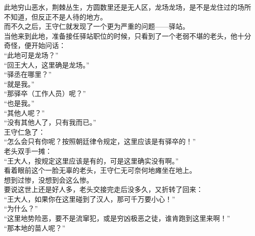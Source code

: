 \begin{multicols}{\theparacolNo}
此地穷山恶水，荆棘丛生，方圆数里还是无人区，龙场龙场，是不是龙住过的场所不知道，但反正不是人待的地方。\\

而不久之后，王守仁就发现了一个更为严重的问题——驿站。\\

当他来到此地，准备接任驿站职位的时候，只看到了一个老弱不堪的老头，他十分奇怪，便开始问话：\\

“此地可是龙场？”\\

“回王大人，这里确是龙场。”\\

“驿丞在哪里？”\\

“就是我。”\\

“那驿卒（工作人员）呢？”\\

“也是我。”\\

“其他人呢？”\\

“没有其他人了，只有我而已。”\\

王守仁急了：\\

“怎么会只有你呢？按照朝廷律令规定，这里应该是有驿卒的！”\\

老头双手一摊：\\

“王大人，按规定这里应该是有的，可是这里确实没有啊。”\\

看着眼前这个一脸无辜的老头，王守仁无可奈何地瘫坐在地上。\\

想到过惨，没想到会这么惨。\\

要说这世上还是好人多，老头交接完走后没多久，又折转了回来：\\

“王大人，如果你在这里碰到了汉人，那可千万要小心！”\\

“为什么？”\\

“这里地势险恶，要不是流窜犯，或是穷凶极恶之徒，谁肯跑到这里来啊！”\\

“那本地的苗人呢？”\\


\end{multicols}
